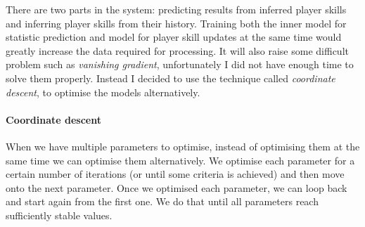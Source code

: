 \documentclass[12pt,a4paper]{book}
\begin{document}
There are two parts in the system: predicting results from inferred player skills and inferring player skills from their history.
Training both the inner model for statistic prediction and model for player skill updates at the same time would greatly increase the data required for processing. %
It will also raise some difficult problem such as \emph{vanishing gradient}, unfortunately I did not have enough time to solve them properly.
Instead I decided to use the technique called \emph{coordinate descent}, to optimise the models alternatively.
\paragraph{Coordinate descent}
When we have multiple parameters to optimise, instead of optimising them at the same time we can optimise them alternatively.
We optimise each parameter for a certain number of iterations (or until some criteria is achieved) and then move onto the next parameter.
Once we optimised each parameter, we can loop back and start again from the first one.
We do that until all parameters reach sufficiently stable values.
\end{document}
